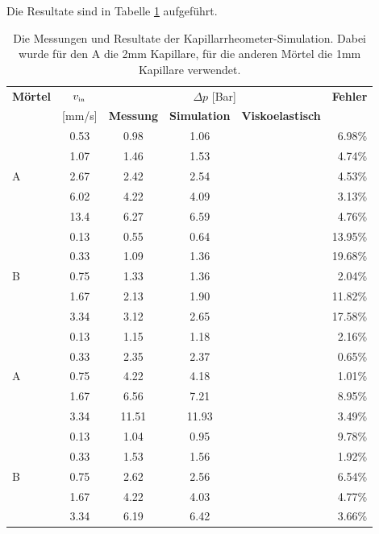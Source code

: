 Die Resultate sind in Tabelle \ref{fig:kapRheoResults} aufgeführt.

%
\begin{table}[bt]
    \centering
    \begin{tabular}{l c c c c r}
        \multicolumn{1}{l}{\textbf{Mörtel}}& 
        \multicolumn{1}{c}{\textbf{$v_\text{\tiny in}$}} & 
        \multicolumn{3}{c}{$\Delta p$ [Bar]} & 
        \multicolumn{1}{l}{\textbf{Fehler}} \\
        & 
        \multicolumn{1}{l}{[mm/s]} & 
        \multicolumn{1}{l}{\textbf{Messung}} & 
        \multicolumn{1}{l}{\textbf{Simulation}} &
        \multicolumn{1}{l}{\textbf{Viskoelastisch}} &
        \\
        \hline
        \multirow{5}{*}{\hit{} A} & 0.53 & 0.98 & 1.06 & & 6.98\%\\
                                  & 1.07 & 1.46 & 1.53 & & 4.74\%\\
                                  & 2.67 & 2.42 & 2.54 & & 4.53\%\\
                                  & 6.02 & 4.22 & 4.09 & & 3.13\%\\
                                  & 13.4 & 6.27 & 6.59 & & 4.76\%\\
        \hline
        \multirow{5}{*}{\hit{} B} & 0.13 & 0.55 & 0.64 & & 13.95\%\\
                                  & 0.33 & 1.09 & 1.36 & & 19.68\%\\
                                  & 0.75 & 1.33 & 1.36 & & 2.04\%\\
                                  & 1.67 & 2.13 & 1.90 & & 11.82\%\\
                                  & 3.34 & 3.12 & 2.65 & & 17.58\%\\
        \hline
        \multirow{5}{*}{\re{} A}  & 0.13 &  1.15 &  1.18 & & 2.16\%\\
                                  & 0.33 &  2.35 &  2.37 & & 0.65\%\\
                                  & 0.75 &  4.22 &  4.18 & & 1.01\%\\
                                  & 1.67 &  6.56 &  7.21 & & 8.95\%\\
                                  & 3.34 & 11.51 & 11.93 & & 3.49\%\\
        \hline
        \multirow{5}{*}{\re{} B}  & 0.13 & 1.04 & 0.95 & & 9.78\%\\
                                  & 0.33 & 1.53 & 1.56 & & 1.92\%\\
                                  & 0.75 & 2.62 & 2.56 & & 6.54\%\\
                                  & 1.67 & 4.22 & 4.03 & & 4.77\%\\
                                  & 3.34 & 6.19 & 6.42 & & 3.66\%\\
    \end{tabular}
    \caption{Die Messungen und Resultate der Kapillarrheometer-Simulation. Dabei wurde für den \hit{} A die 2mm Kapillare, für die anderen Mörtel die 1mm Kapillare verwendet.}
    \label{fig:kapRheoResults}
\end{table}
